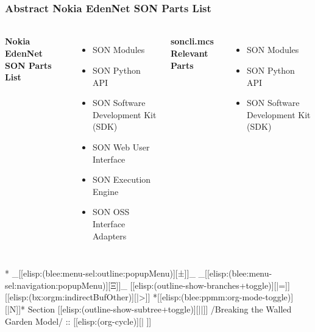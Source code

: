 \begin{whenOrg}
\begin{verblatex}
\begin{frame}[fragile,plain,label=nokiaSonPartsList]
    \frametitle{Abstract Nokia EdenNet SON Parts List}
    \framesubtitle{}



\begin{columns}[T]

\textbf{Nokia EdenNet SON Parts List}
\begin{itemize}
  \item SON Modules
  \item SON Python API
  \item SON Software Development Kit (SDK)
  \item SON Web User Interface
  \item SON Execution Engine
  \item SON OSS Interface Adapters
\end{itemize}


\textbf{soncli.mcs Relevant Parts}
\begin{itemize}
  \item SON Modules
  \item SON Python API
  \item SON Software Development Kit (SDK)
\end{itemize}

\end{columns}



\end{frame}
\end{verblatex}


\begin{whenOrg}
*  _[[elisp:(blee:menu-sel:outline:popupMenu)][±]]_ _[[elisp:(blee:menu-sel:navigation:popupMenu)][Ξ]]_ [[elisp:(outline-show-branches+toggle)][|=]] [[elisp:(bx:orgm:indirectBufOther)][|>]] *[[elisp:(blee:ppmm:org-mode-toggle)][|N]]*  Section    [[elisp:(outline-show-subtree+toggle)][||]]   /Breaking the Walled Garden Model/ ::  [[elisp:(org-cycle)][| ]]
\end{whenOrg}


\end{whenOrg}
